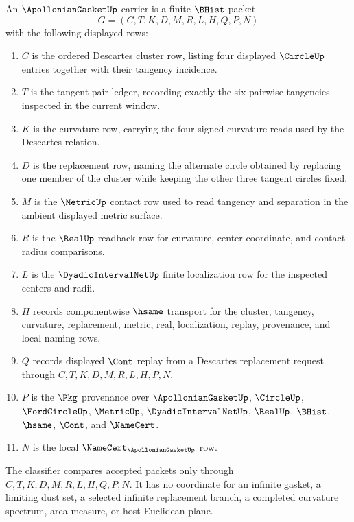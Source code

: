 \begin{definition}
\label{def:apollonian-gasket-carrier}
An $\ApollonianGasketUp$ carrier is a finite $\BHist$ packet
$$
G=(C,T,K,D,M,R,L,H,Q,P,N)
$$
with the following displayed rows:
\begin{enumerate}
\item $C$ is the ordered Descartes cluster row, listing four displayed $\CircleUp$ entries together with their tangency incidence.
\item $T$ is the tangent-pair ledger, recording exactly the six pairwise tangencies inspected in the current window.
\item $K$ is the curvature row, carrying the four signed curvature reads used by the Descartes relation.
\item $D$ is the replacement row, naming the alternate circle obtained by replacing one member of the cluster while keeping the other three tangent circles fixed.
\item $M$ is the $\MetricUp$ contact row used to read tangency and separation in the ambient displayed metric surface.
\item $R$ is the $\RealUp$ readback row for curvature, center-coordinate, and contact-radius comparisons.
\item $L$ is the $\DyadicIntervalNetUp$ finite localization row for the inspected centers and radii.
\item $H$ records componentwise $\hsame$ transport for the cluster, tangency, curvature, replacement, metric, real, localization, replay, provenance, and local naming rows.
\item $Q$ records displayed $\Cont$ replay from a Descartes replacement request through $C,T,K,D,M,R,L,H,P,N$.
\item $P$ is the $\Pkg$ provenance over $\ApollonianGasketUp$, $\CircleUp$, $\FordCircleUp$, $\MetricUp$, $\DyadicIntervalNetUp$, $\RealUp$, $\BHist$, $\hsame$, $\Cont$, and $\NameCert$.
\item $N$ is the local $\NameCert_{\ApollonianGasketUp}$ row.
\end{enumerate}
The classifier compares accepted packets only through $C,T,K,D,M,R,L,H,Q,P,N$. It has no coordinate for an infinite gasket, a limiting dust set, a selected infinite replacement branch, a completed curvature spectrum, area measure, or host Euclidean plane.
\end{definition}

